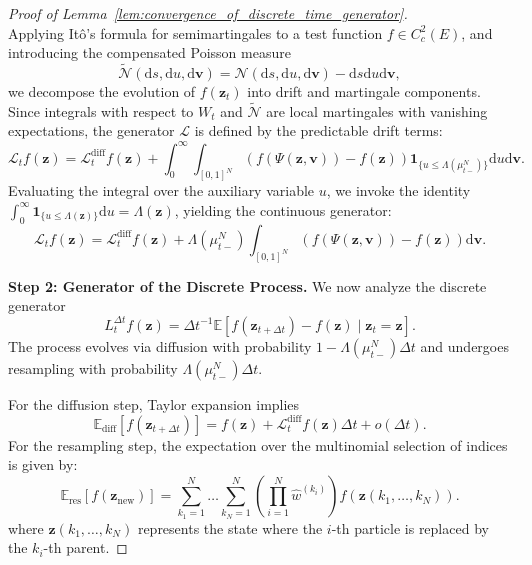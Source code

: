 \documentclass{article}
\newcommand{\mathbbm}[1]{\boldsymbol{#1}}
\theoremstyle{plain}
\theoremstyle{definition}
\theoremstyle{remark}
\newcommand{\dif}{{\mathrm{d}}}
\begin{document}
\begin{proof}[Proof of Lemma~\ref{lem:convergence_of_discrete_time_generator}]
\begin{equation*}
    \end{equation*}
    Applying It\^o's formula for semimartingales to a test function $f \in C_c^2(E)$, and introducing the compensated Poisson measure 
    $$
        \widetilde{\mathcal{N}}(\dif s,\dif u, \dif \mathbbm{v}) = \mathcal{N}(\dif s,\dif u, \dif \mathbbm{v}) - \dif s \dif u \dif \mathbbm{v},
    $$ 
    we decompose the evolution of $f(\mathbbm{z}_t)$ into drift and martingale components. Since integrals with respect to $W_t$ and $\widetilde{\mathcal{N}}$ are local martingales with vanishing expectations, the generator $\mathcal{L}$ is defined by the predictable drift terms:
    \[
    \mathcal{L}_tf(\mathbbm{z}) = \mathcal{L}^{\text{diff}}_tf(\mathbbm{z}) + \int_0^\infty \int_{[0,1]^N} \left( f(\Psi(\mathbbm{z}, \mathbbm{v})) - f(\mathbbm{z}) \right) \mathbbm{1}_{\{u \le \Lambda(\mu^N_{t-})\}} \dif u  \dif \mathbbm{v}.
    \]
    Evaluating the integral over the auxiliary variable $u$, we invoke the identity $\int_0^\infty \mathbbm{1}_{\{u \le \Lambda(\mathbbm{z})\}} \mathrm{d}u = \Lambda(\mathbbm{z})$, yielding the continuous generator:
    \begin{equation*}
    \mathcal{L}_t f(\mathbbm{z}) = \mathcal{L}^{\text{diff}}_t f(\mathbbm{z}) + \Lambda(\mu^N_{t-}) \int_{[0,1]^N} \left( f(\Psi(\mathbbm{z}, \mathbbm{v})) - f(\mathbbm{z}) \right)  \mathrm{d}\mathbbm{v}.
    \end{equation*}
    
    \textbf{Step 2: Generator of the Discrete Process.}
    We now analyze the discrete generator 
    $$
        L^{\Delta t}_t f(\mathbbm{z}) = \Delta t^{-1} \mathbb{E}[f(\mathbbm{z}_{t+\Delta t}) - f(\mathbbm{z}) \mid \mathbbm{z}_t = \mathbbm{z}].
    $$ 
    The process evolves via diffusion with probability $1 - \Lambda(\mu^N_{t-})\Delta t$ and undergoes resampling with probability $\Lambda(\mu^N_{t-})\Delta t$.
    
    For the diffusion step, Taylor expansion implies 
    $$
        \mathbb{E}_{\text{diff}}[f(\mathbbm{z}_{t+\Delta t})] = f(\mathbbm{z}) + \mathcal{L}^{\text{diff}}_t f(\mathbbm{z})\Delta t + o(\Delta t).
    $$ 
    For the resampling step, the expectation over the multinomial selection of indices is given by:
    \[
    \mathbb{E}_{\text{res}}[f(\mathbbm{z}_{\text{new}})] = \sum_{k_1=1}^N \dots \sum_{k_N=1}^N \left( \prod_{i=1}^N \widehat{w}^{(k_i)} \right) f\left( \mathbbm{z}(k_1, \dots, k_N) \right).
    \]
    where $\mathbbm{z}(k_1, \dots, k_N)$ represents the state where the $i$-th particle is replaced by the $k_i$-th parent.
    

\end{proof}
\end{document}
